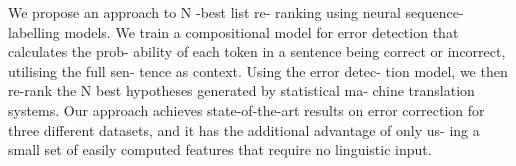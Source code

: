 We propose an approach to N -best list re- ranking using neural sequence-labelling models. We train a compositional model for error detection that calculates the prob- ability of each token in a sentence being correct or incorrect, utilising the full sen- tence as context. Using the error detec- tion model, we then re-rank the N best hypotheses generated by statistical ma- chine translation systems. Our approach achieves state-of-the-art results on error correction for three different datasets, and it has the additional advantage of only us- ing a small set of easily computed features that require no linguistic input.

